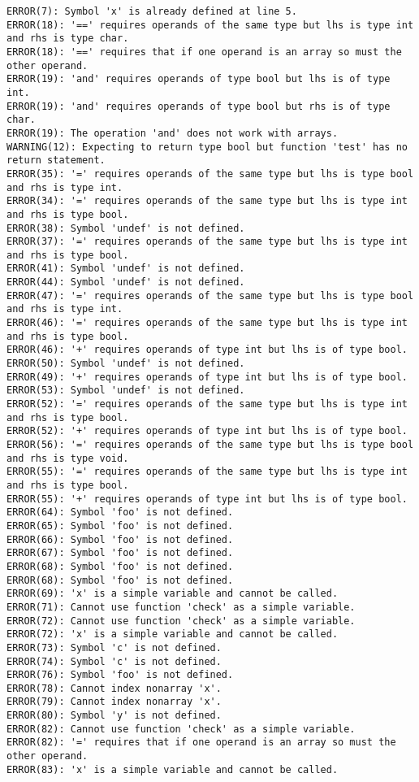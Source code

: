 \documentclass[12pt]{book}
\begin{document}
\begin{lstlisting}
ERROR(7): Symbol 'x' is already defined at line 5.
ERROR(18): '==' requires operands of the same type but lhs is type int and rhs is type char.
ERROR(18): '==' requires that if one operand is an array so must the other operand.
ERROR(19): 'and' requires operands of type bool but lhs is of type int.
ERROR(19): 'and' requires operands of type bool but rhs is of type char.
ERROR(19): The operation 'and' does not work with arrays.
WARNING(12): Expecting to return type bool but function 'test' has no return statement.
ERROR(35): '=' requires operands of the same type but lhs is type bool and rhs is type int.
ERROR(34): '=' requires operands of the same type but lhs is type int and rhs is type bool.
ERROR(38): Symbol 'undef' is not defined.
ERROR(37): '=' requires operands of the same type but lhs is type int and rhs is type bool.
ERROR(41): Symbol 'undef' is not defined.
ERROR(44): Symbol 'undef' is not defined.
ERROR(47): '=' requires operands of the same type but lhs is type bool and rhs is type int.
ERROR(46): '=' requires operands of the same type but lhs is type int and rhs is type bool.
ERROR(46): '+' requires operands of type int but lhs is of type bool.
ERROR(50): Symbol 'undef' is not defined.
ERROR(49): '+' requires operands of type int but lhs is of type bool.
ERROR(53): Symbol 'undef' is not defined.
ERROR(52): '=' requires operands of the same type but lhs is type int and rhs is type bool.
ERROR(52): '+' requires operands of type int but lhs is of type bool.
ERROR(56): '=' requires operands of the same type but lhs is type bool and rhs is type void.
ERROR(55): '=' requires operands of the same type but lhs is type int and rhs is type bool.
ERROR(55): '+' requires operands of type int but lhs is of type bool.
ERROR(64): Symbol 'foo' is not defined.
ERROR(65): Symbol 'foo' is not defined.
ERROR(66): Symbol 'foo' is not defined.
ERROR(67): Symbol 'foo' is not defined.
ERROR(68): Symbol 'foo' is not defined.
ERROR(68): Symbol 'foo' is not defined.
ERROR(69): 'x' is a simple variable and cannot be called.
ERROR(71): Cannot use function 'check' as a simple variable.
ERROR(72): Cannot use function 'check' as a simple variable.
ERROR(72): 'x' is a simple variable and cannot be called.
ERROR(73): Symbol 'c' is not defined.
ERROR(74): Symbol 'c' is not defined.
ERROR(76): Symbol 'foo' is not defined.
ERROR(78): Cannot index nonarray 'x'.
ERROR(79): Cannot index nonarray 'x'.
ERROR(80): Symbol 'y' is not defined.
ERROR(82): Cannot use function 'check' as a simple variable.
ERROR(82): '=' requires that if one operand is an array so must the other operand.
ERROR(83): 'x' is a simple variable and cannot be called.

\end{lstlisting}
\end{document}
